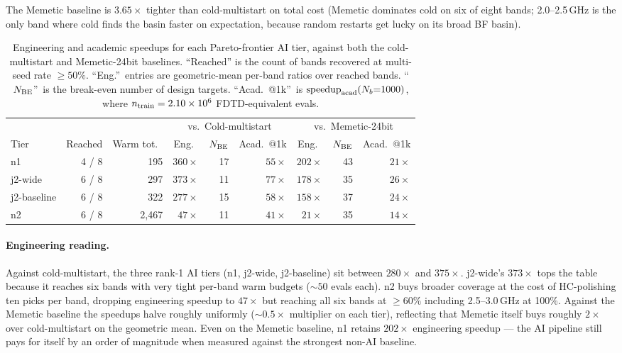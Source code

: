 The Memetic baseline is $3.65\times$ tighter than cold-multistart on
total cost (Memetic dominates cold on six of eight bands;
2.0--2.5\,GHz is the only band where cold finds the basin faster on
expectation, because random restarts get lucky on its broad BF
basin).

\begin{table}[t]
\centering
\caption[Engineering and academic speedups per Pareto-frontier tier]{Engineering and academic speedups for each Pareto-frontier
AI tier, against both the cold-multistart and Memetic-24bit baselines.
``Reached'' is the count of bands recovered at multi-seed rate $\geq
50\%$. ``Eng.''\ entries are geometric-mean per-band ratios over
reached bands. ``$N_{\rm BE}$''\ is the break-even number of design
targets. ``Acad.\ @1k''\ is $\mathrm{speedup}_{\rm acad}(N_b{=}1000)$,
where $n_{\rm train} = 2.10\times 10^6$ FDTD-equivalent evals.}
\label{tab:speedup}
\small
\setlength{\tabcolsep}{4pt}
\renewcommand{\arraystretch}{1.05}
\begin{tabular}{lrr|rrr|rrr}
\toprule
            &         &           & \multicolumn{3}{c|}{vs.\ Cold-multistart}
                                  & \multicolumn{3}{c}{vs.\ Memetic-24bit} \\
Tier        & Reached & Warm tot.\
            & Eng.\ & $N_{\rm BE}$ & Acad.\ @1k
            & Eng.\ & $N_{\rm BE}$ & Acad.\ @1k \\
\midrule
n1          & 4 / 8 & 195
            & $360\times$ & 17 & $55\times$
            & $202\times$ & 43 & $21\times$ \\
j2-wide     & 6 / 8 & 297
            & $373\times$ & 11 & $77\times$
            & $178\times$ & 35 & $26\times$ \\
j2-baseline & 6 / 8 & 322
            & $277\times$ & 15 & $58\times$
            & $158\times$ & 37 & $24\times$ \\
n2          & 6 / 8 & 2{,}467
            & $47\times$  & 11 & $41\times$
            & $21\times$  & 35 & $14\times$ \\
\bottomrule
\end{tabular}
\end{table}

\paragraph{Engineering reading.}
Against cold-multistart, the three rank-1 AI tiers (n1, j2-wide,
j2-baseline) sit between $280\times$ and $375\times$. j2-wide's
$373\times$ tops the table because it reaches six bands with very
tight per-band warm budgets ($\sim 50$ evals each). n2 buys broader
coverage at the cost of HC-polishing ten picks per band, dropping
engineering speedup to $47\times$ but reaching all six bands at
$\geq 60\%$ including 2.5--3.0\,GHz at 100\%.
Against the Memetic baseline the speedups halve roughly uniformly
($\sim 0.5\times$ multiplier on each tier), reflecting that Memetic
itself buys roughly $2\times$ over cold-multistart on the geometric
mean. Even on the Memetic baseline, n1 retains $202\times$
engineering speedup --- the AI pipeline still pays for itself by an
order of magnitude when measured against the strongest non-AI
baseline.

